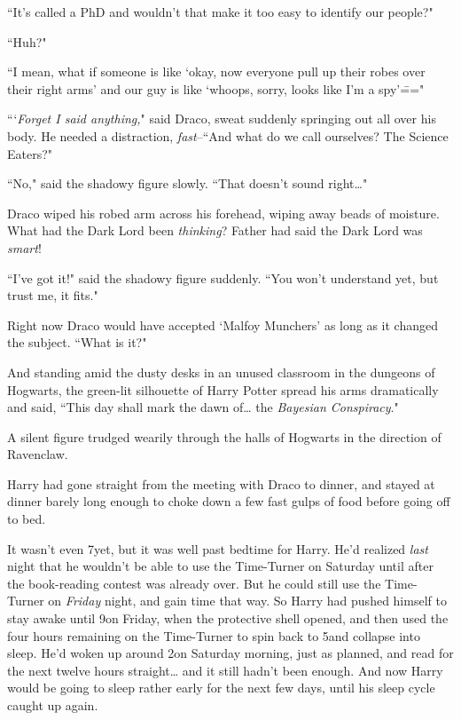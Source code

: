 ``It's called a PhD and wouldn't that make it too easy to identify our people?"

``Huh?"

``I mean, what if someone is like `okay, now everyone pull up their robes over their right arms' and our guy is like `whoops, sorry, looks like I'm a spy'\==="

```\emph{Forget I said anything,}" said Draco, sweat suddenly springing out all over his body. He needed a distraction, \emph{fast}\---``And what do we call ourselves? The Science Eaters?"

``No," said the shadowy figure slowly. ``That doesn't sound right{\ldots}"

Draco wiped his robed arm across his forehead, wiping away beads of moisture. What had the Dark Lord been \emph{thinking}? Father had said the Dark Lord was \emph{smart}!

``I've got it!" said the shadowy figure suddenly. ``You won't understand yet, but trust me, it fits."

Right now Draco would have accepted `Malfoy Munchers' as long as it changed the subject. ``What is it?"

And standing amid the dusty desks in an unused classroom in the dungeons of Hogwarts, the green-lit silhouette of Harry Potter spread his arms dramatically and said, ``This day shall mark the dawn of{\ldots} the \emph{Bayesian Conspiracy}."

\later

A silent figure trudged wearily through the halls of Hogwarts in the direction of Ravenclaw.

Harry had gone straight from the meeting with Draco to dinner, and stayed at dinner barely long enough to choke down a few fast gulps of food before going off to bed.

It wasn't even 7\pm yet, but it was well past bedtime for Harry. He'd realized \emph{last} night that he wouldn't be able to use the Time-Turner on Saturday until after the book-reading contest was already over. But he could still use the Time-Turner on \emph{Friday} night, and gain time that way. So Harry had pushed himself to stay awake until 9\pm on Friday, when the protective shell opened, and then used the four hours remaining on the Time-Turner to spin back to 5\pm and collapse into sleep. He'd woken up around 2\am on Saturday morning, just as planned, and read for the next twelve hours straight{\ldots} and it still hadn't been enough. And now Harry would be going to sleep rather early for the next few days, until his sleep cycle caught up again.

